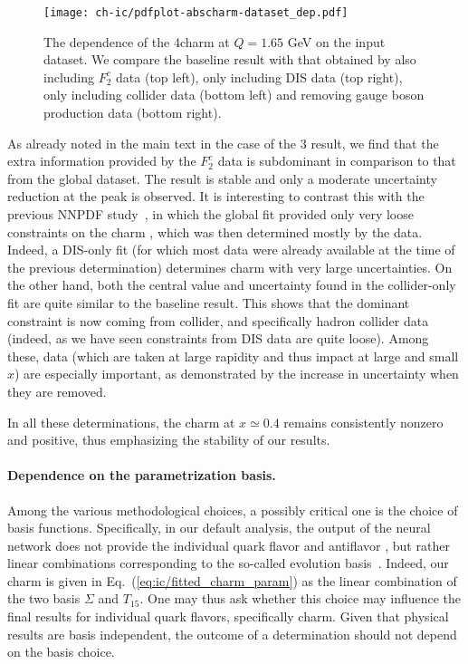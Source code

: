 \begin{figure}[t!]
  \begin{center}
    \texttt{[image: ch-ic/pdfplot-abscharm-dataset\_dep.pdf]}
    \caption{\small The dependence of the 4\fns charm \pdf at $Q=1.65$ GeV on
      the input dataset.
      We compare the
    baseline result with that obtained by also including 
      \emc $F_2^c$ data (top left), only including DIS data (top
    right), only including collider data (bottom left) and removing
    \lhcb gauge boson production data (bottom right). 
  \label{fig:ic/charm_dataset_dep} }
\end{center}
\end{figure}

As already noted in the main  text in the case of the 3\fns
result, we find that the extra information provided by the  \emc
$F_2^c$ data is subdominant in comparison to that from the global
dataset. The result is stable and only a moderate
uncertainty reduction at the peak is observed. It is interesting to
contrast this with the previous NNPDF study~\cite{Ball:2016neh}, in
which the global fit provided only very loose constraints on the charm
\pdf, which was then determined mostly by the \emc data.
%
Indeed, a DIS-only fit (for which most data were already available at the time
of the previous determination) determines charm with very large
uncertainties. On the other hand, both the central value and
uncertainty found in the collider-only fit are quite similar to the
baseline result.
%
This shows that the dominant constraint is now coming from
collider, and specifically hadron collider data (indeed, as we have
seen constraints from DIS data are quite loose). Among these, \lhcb
data (which are taken at large rapidity and thus impact \pdfs at large
and small $x$) are especially important, as demonstrated by the
increase in uncertainty when they are removed.

In all these determinations, the charm
\pdf at $x\simeq 0.4$ remains consistently nonzero and positive, thus
emphasizing the stability of our results.

\paragraph{Dependence on the parametrization basis.}
%
Among the various methodological choices, a possibly critical one is
the choice of basis functions. Specifically, in our default analysis,
the output of the neural network does not provide the individual
quark flavor and antiflavor \pdfs, but rather linear combinations
corresponding to the so-called evolution
basis~\cite{Ball:2021leu}. Indeed, our charm \pdf is given in
Eq.~(\ref{eq:ic/fitted_charm_param})  as the linear combination of the
two basis \pdfs $\Sigma$ and $T_{15}$.
One may thus ask whether this choice may influence the final results
for individual quark flavors, specifically charm.
Given that physical results are basis
independent, the outcome of a \pdf determination should not depend
on the basis choice.

